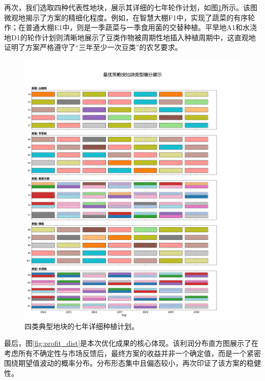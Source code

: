 再次，我们选取四种代表性地块，展示其详细的七年轮作计划，如图\ref{fig:plot_plan}所示。该图微观地揭示了方案的精细化程度。例如，在智慧大棚F1中，实现了蔬菜的有序轮作；在普通大棚E1中，则是一季蔬菜与一季食用菌的交替种植。平旱地A1和水浇地D1的轮作计划则清晰地展示了豆类作物被周期性地插入种植周期中，这直观地证明了方案严格遵守了“三年至少一次豆类”的农艺要求。

\begin{figure}[H]
    \centering
    \includegraphics[width=\textwidth]{figs/5问题三/典型地块种植计划图.png}
    \caption{四类典型地块的七年详细种植计划。}
    \label{fig:plot_plan}
\end{figure}

最后，图\ref{fig:profit_dist}是本次优化成果的核心体现。该利润分布直方图展示了在考虑所有不确定性与市场反馈后，最终方案的收益并非一个确定值，而是一个紧密围绕期望值波动的概率分布。分布形态集中且偏态较小，再次印证了该方案的稳健性。

